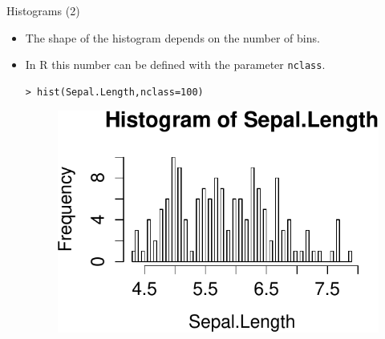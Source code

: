 \documentclass[handout]{beamer}
\begin{document}
\begin{frame}[fragile]{Histograms (2) }
\scriptsize{
\begin{itemize}
 \item The shape of the histogram depends on the number of bins.
 \item In R this number can be defined with the parameter  \verb+nclass+.
 \begin{verbatim}
> hist(Sepal.Length,nclass=100)
 \end{verbatim}
 \begin{figure}[h!]
	\centering
	\includegraphics[scale=0.6]{pics/hist2.pdf}
	
	
\end{figure} 

\end{itemize}

}
\end{frame}
\end{document}
